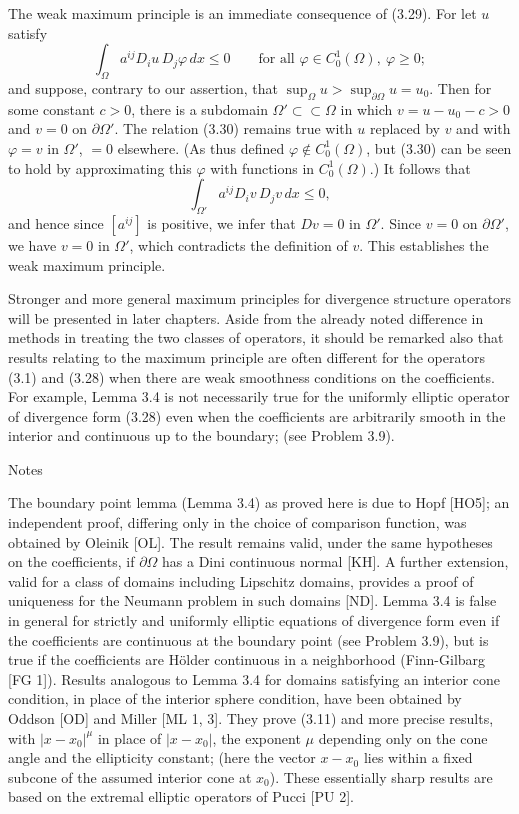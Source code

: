 The weak maximum principle is an immediate consequence of (3.29). For let $u$ satisfy
\[
\int_{\Omega} a^{ij} D_i u\, D_j \varphi \, dx \leq 0 \qquad \text{for all } \varphi \in C_0^1(\Omega), \ \varphi \geq 0;
\tag{3.30}
\]
and suppose, contrary to our assertion, that $\sup_{\Omega} u > \sup_{\partial\Omega} u = u_0$. Then for some constant $c>0$, there is a subdomain $\Omega' \subset \subset \Omega$ in which $v = u-u_0-c > 0$ and $v = 0$ on $\partial\Omega'$. The relation (3.30) remains true with $u$ replaced by $v$ and with $\varphi = v$ in $\Omega'$, $= 0$ elsewhere. (As thus defined $\varphi \notin C_0^1(\Omega)$, but (3.30) can be seen to hold by approximating this $\varphi$ with functions in $C_0^1(\Omega)$.) It follows that
\[
\int_{\Omega'} a^{ij} D_i v\, D_j v\, dx \leq 0,
\]
and hence since $[a^{ij}]$ is positive, we infer that $D v = 0$ in $\Omega'$. Since $v = 0$ on $\partial\Omega'$, we have $v = 0$ in $\Omega'$, which contradicts the definition of $v$. This establishes the weak maximum principle.

Stronger and more general maximum principles for divergence structure operators will be presented in later chapters. Aside from the already noted difference in methods in treating the two classes of operators, it should be remarked also that results relating to the maximum principle are often different for the operators (3.1) and (3.28) when there are weak smoothness conditions on the coefficients. For example, Lemma 3.4 is not necessarily true for the uniformly elliptic operator of divergence form (3.28) even when the coefficients are arbitrarily smooth in the interior and continuous up to the boundary; (see Problem 3.9).

Notes

The boundary point lemma (Lemma 3.4) as proved here is due to Hopf [HO5]; an independent proof, differing only in the choice of comparison function, was obtained by Oleinik [OL]. The result remains valid, under the same hypotheses on the coefficients, if $\partial\Omega$ has a Dini continuous normal [KH]. A further extension, valid for a class of domains including Lipschitz domains, provides a proof of uniqueness for the Neumann problem in such domains [ND]. Lemma 3.4 is false in general for strictly and uniformly elliptic equations of divergence form even if the coefficients are continuous at the boundary point (see Problem 3.9), but is true if the coefficients are Hölder continuous in a neighborhood (Finn-Gilbarg [FG 1]). Results analogous to Lemma 3.4 for domains satisfying an interior cone condition, in place of the interior sphere condition, have been obtained by Oddson [OD] and Miller [ML 1, 3]. They prove (3.11) and more precise results, with $|x - x_0|^\mu$ in place of $|x - x_0|$, the exponent $\mu$ depending only on the cone angle and the ellipticity constant; (here the vector $x - x_0$ lies within a fixed subcone of the assumed interior cone at $x_0$). These essentially sharp results are based on the extremal elliptic operators of Pucci [PU 2].

